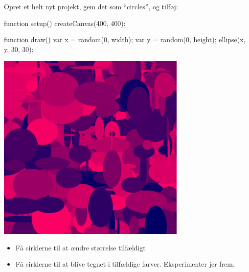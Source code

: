 \documentclass{ucph-handout}
\begin{document}
\newpage
\begin{exercisebox}[adjusted title=Tilfældighed]
  \vspace{-2mm}
  \begin{minipage}{0.65\linewidth}
Opret et helt nyt projekt, gem det som ``circles'', og tilføj:
\begin{javascript}
function setup() {
    createCanvas(400, 400);
}

function draw() {
    var x = random(0, width);
    var y = random(0, height);
    ellipse(x, y, 30, 30);
}
\end{javascript}

\end{minipage}
\begin{minipage}{0.34\linewidth}
\vspace{-3mm}
\begin{center}
\includegraphics[width=0.7\textwidth]{../illustrations/images/randomcircles.png}
\end{center}
\end{minipage}
\vspace{-4mm}

\vspace{-4mm}
\begin{itemize}
\item Få cirklerne til at ændre størrelse tilfældigt
\item \vspace{-2mm}Få cirklerne til at blive tegnet i tilfældige
  farver. Eksperimenter jer frem.
\end{itemize}
\vspace{-6mm}
\end{exercisebox}
\end{document}
